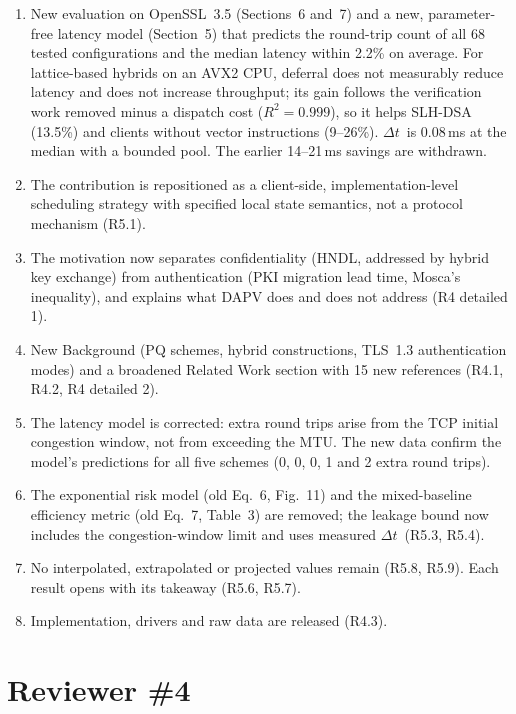 \documentclass[11pt]{article}
\newcommand{\Dt}{\ensuremath{\Delta t}}
\begin{document}
\begin{enumerate}[noitemsep]
\item New evaluation on OpenSSL~3.5 (Sections~6 and~7) and a new,
  parameter-free latency model (Section~5) that predicts the round-trip
  count of all 68 tested configurations and the median latency within
  2.2\% on average.  For lattice-based hybrids on an AVX2 CPU, deferral does
  not measurably reduce latency and does not increase throughput; its gain
  follows the verification work removed minus a dispatch cost
  ($R^2 = 0.999$), so it helps SLH-DSA (13.5\%) and clients without vector
  instructions (9--26\%).  \Dt\ is 0.08\,ms at the median with a bounded
  pool.  The earlier 14--21\,ms savings are withdrawn.
\item The contribution is repositioned as a client-side,
  implementation-level scheduling strategy with specified local state
  semantics, not a protocol mechanism (R5.1).
\item The motivation now separates confidentiality (HNDL, addressed by
  hybrid key exchange) from authentication (PKI migration lead time,
  Mosca's inequality), and explains what DAPV does and does not address
  (R4 detailed 1).
\item New Background (PQ schemes, hybrid constructions, TLS~1.3
  authentication modes) and a broadened Related Work section with 15 new
  references (R4.1, R4.2, R4 detailed 2).
\item The latency model is corrected: extra round trips arise from the TCP
  initial congestion window, not from exceeding the MTU.  The new data
  confirm the model's predictions for all five schemes (0, 0, 0, 1 and 2
  extra round trips).
\item The exponential risk model (old Eq.~6, Fig.~11) and the mixed-baseline
  efficiency metric (old Eq.~7, Table~3) are removed; the leakage bound now
  includes the congestion-window limit and uses measured \Dt\ (R5.3, R5.4).
\item No interpolated, extrapolated or projected values remain (R5.8, R5.9).
  Each result opens with its takeaway (R5.6, R5.7).
\item Implementation, drivers and raw data are released (R4.3).
\end{enumerate}

\section*{Reviewer \#4}
\end{document}
